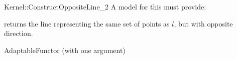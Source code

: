 \begin{ccRefFunctionObjectConcept}{Kernel::ConstructOppositeLine_2}
A model for this must provide:


{returns the line representing the same set of points as $l$,
but with opposite direction.}

\ccRefines
AdaptableFunctor (with one argument)

\ccSeeAlso
{} \\

\end{ccRefFunctionObjectConcept}
